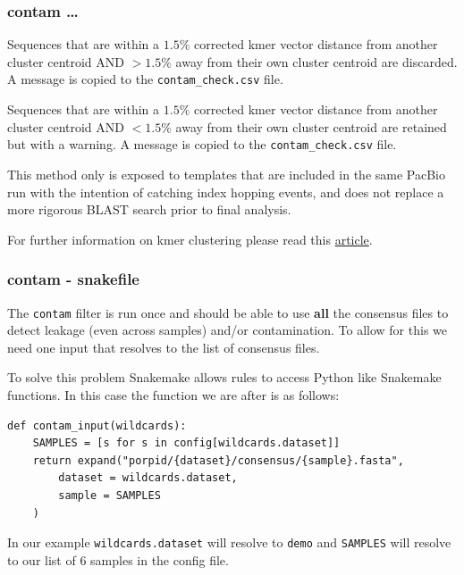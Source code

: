 \documentclass{beamer}
\begin{document}
\begin{frame}[fragile]
\frametitle{contam \ldots}

\alert<1> 

Sequences that are within a $1.5\%$ corrected kmer vector distance from another cluster centroid AND $> 1.5\%$ away from their own cluster centroid are discarded. A message is copied to the {\tt contam\_check.csv} file.

\bigskip
Sequences that are within a $1.5\%$ corrected kmer vector distance from another cluster centroid AND $< 1.5\%$ away from their own cluster centroid are retained but with a warning.  A message is copied to the {\tt contam\_check.csv} file.

\bigskip
This method only is exposed to templates that are included in the same PacBio run with the intention of catching index hopping events, and does not replace a more rigorous BLAST search prior to final analysis.

\bigskip
For further information on kmer clustering please read this \href{https://academic.oup.com/nar/article/47/18/e104/5550323}{\color{blue}  article}.

\end{frame}

\begin{frame}[fragile]
\frametitle{contam - snakefile }

\alert<1> 

The {\tt contam} filter is run once and should be able to use {\bf all} the consensus files to detect leakage
(even across samples) and/or contamination. To allow for this we need one input that resolves to the list of
consensus files. 

\bigskip
To solve this problem Snakemake allows rules to access Python like
Snakemake functions. In this case the function we are after is as follows:

\begin{tiny}
\begin{verbatim}
def contam_input(wildcards):
    SAMPLES = [s for s in config[wildcards.dataset]]
    return expand("porpid/{dataset}/consensus/{sample}.fasta",
        dataset = wildcards.dataset,
        sample = SAMPLES
    )
\end{verbatim}
\end{tiny}

In our example {\tt wildcards.dataset} will resolve to {\tt demo}
and {\tt SAMPLES} will resolve to our list of 6 samples in the
config file.

\end{frame}
\end{document}
